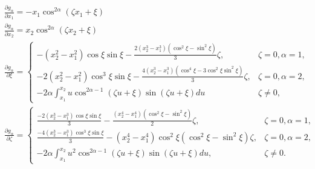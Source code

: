\documentclass[12pt]{article}
\begin{document}
\begin{subequations}
\begin{align}
&\frac{\partial g_{\alpha}}{\partial x_1}=-x_1\cos^{2\alpha}(\zeta x_1 +\xi)\label{eq:dgdx_1}\\
&\frac{\partial g_{\alpha}}{\partial x_2}=x_2\cos^{2\alpha}(\zeta x_2+\xi)\label{eq:dgdx_2}\\
&\frac{\partial g_{\alpha}}{\partial\xi}=
	\begin{cases}
	-(x_2^2-x_1^2)\cos\xi\sin\xi-\frac{2(x_2^3-x_1^3)(\cos^2\xi-\sin^2\xi)}{3}\zeta,	&\zeta=0,\alpha=1,\\
	-2(x_2^2-x_1^2)\cos^3\xi\sin\xi-\frac{4(x_2^3-x_1^3)(\cos^4\xi-3\cos^2\xi\sin^2\xi)}{3}\zeta,	&\zeta=0,\alpha=2,\\
	-2\alpha\int_{x_1}^{x_2} u\cos^{2\alpha-1}(\zeta u +\xi)\sin(\zeta u+\xi)du
		&\zeta\neq0,
	\end{cases}\label{eq:dgdxi}\\
&\frac{\partial g_{\alpha}}{\partial\zeta}=
	\begin{cases}
	\frac{-2(x_2^3-x_1^3)\cos\xi\sin\xi}{3}-\frac{(x_2^4-x_1^4)(\cos^2\xi-\sin^2\xi)}{2}\zeta,	&\zeta=0,\alpha=1,\\
	\frac{-4(x_2^3-x_1^3)\cos^3\xi\sin\xi}{3}-(x_2^4-x_1^4)\cos^2\xi(\cos^2\xi-\sin^2\xi)\zeta,	&\zeta=0,\alpha=2,\\
	-2\alpha\int_{x_1}^{x_2} u^2\cos^{2\alpha-1}(\zeta u +\xi)\sin(\zeta u+\xi)du,	&\zeta\neq0.\end{cases}\label{eq:dgdzeta}
\end{align}
\end{subequations}

	
\clearpage


\end{document}
